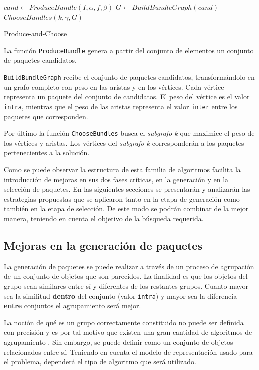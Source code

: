 \begin{center}
	\begin{algorithm}[H]
	\DontPrintSemicolon
	\SetAlgoLined
		$cand \leftarrow ProduceBundle(I,\alpha,f,\beta)$\;
		$G \leftarrow BuildBundleGraph(cand)$\;
		\Return $ChooseBundles(k,\gamma,G)$\;
	\caption{Produce-and-Choose}\label{alg:PAC}
	\end{algorithm}
\end{center}

La función \texttt{ProduceBundle} genera a partir del conjunto de elementos un conjunto de paquetes candidatos.

\texttt{BuildBundleGraph} recibe el conjunto de paquetes candidatos, transformándolo en un grafo completo con peso en las aristas y en los vértices. Cada vértice representa un paquete del conjunto de candidatos. El peso del vértice es el valor \texttt{intra}, mientras que el peso de las aristas representa el valor \texttt{inter} entre los paquetes que corresponden. 

Por último la función \texttt{ChooseBundles} busca el \textit{subgrafo-k} que maximice el peso de los vértices y aristas. Los vértices del \textit{subgrafo-k} corresponderán a los paquetes pertenecientes a la solución.

Como se puede observar la estructura de esta familia de algoritmos facilita la introducción de mejoras en sus dos fases críticas, en la generación y en la selección de paquetes. En las siguientes secciones se presentarán y analizarán las estrategias propuestas que se aplicaron tanto en la etapa de generación como también en la etapa de selección. De este modo se podrán combinar de la mejor manera, teniendo en cuenta el objetivo de la búsqueda requerida.

\subsection{Mejoras en la generación de paquetes}
La generación de paquetes se puede realizar a través de un proceso de agrupación de un conjunto de objetos que son parecidos. La finalidad es que los objetos del grupo sean similares entre sí y diferentes de los restantes grupos. Cuanto mayor sea la similitud \textbf{dentro} del conjunto (valor \texttt{intra}) y mayor sea la diferencia \textbf{entre} conjuntos el agrupamiento será mejor.

La noción de qué es un grupo correctamente constituido no puede ser definida con precisión y es por tal motivo que existen una gran cantidad de algoritmos de agrupamiento \cite{Estivill-Castro:2002:WSM:568574.568575}. Sin embargo, se puede definir como un conjunto de objetos relacionados entre sí. Teniendo en cuenta el modelo de representación usado para el problema, dependerá el tipo de algoritmo que será utilizado.

